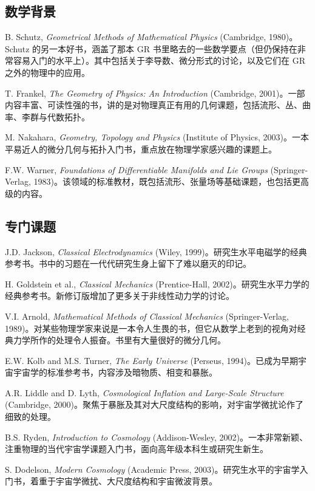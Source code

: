 \subsection*{数学背景}

B. Schutz, \emph{Geometrical Methods of Mathematical Physics} (Cambridge, 1980)。Schutz 的另一本好书，涵盖了那本 GR 书里略去的一些数学要点（但仍保持在非常容易入门的水平上）。其中包括关于李导数、微分形式的讨论，以及它们在 GR 之外的物理中的应用。

T. Frankel, \emph{The Geometry of Physics: An Introduction} (Cambridge, 2001)。一部内容丰富、可读性强的书，讲的是对物理真正有用的几何课题，包括流形、丛、曲率、李群与代数拓扑。

M. Nakahara, \emph{Geometry, Topology and Physics} (Institute of Physics, 2003)。一本平易近人的微分几何与拓扑入门书，重点放在物理学家感兴趣的课题上。

F.W. Warner, \emph{Foundations of Differentiable Manifolds and Lie Groups} (Springer-Verlag, 1983)。该领域的标准教材，既包括流形、张量场等基础课题，也包括更高级的内容。

\subsection*{专门课题}

J.D. Jackson, \emph{Classical Electrodynamics} (Wiley, 1999)。研究生水平电磁学的经典参考书。书中的习题在一代代研究生身上留下了难以磨灭的印记。

H. Goldstein et al., \emph{Classical Mechanics} (Prentice-Hall, 2002)。研究生水平力学的经典参考书。新修订版增加了更多关于非线性动力学的讨论。

V.I. Arnold, \emph{Mathematical Methods of Classical Mechanics} (Springer-Verlag, 1989)。对某些物理学家来说是一本令人生畏的书，但它从数学上老到的视角对经典力学所作的处理令人振奋。书里有大量很好的微分几何。

E.W. Kolb and M.S. Turner, \emph{The Early Universe} (Perseus, 1994)。已成为早期宇宙宇宙学的标准参考书，内容涉及暗物质、相变和暴胀。

A.R. Liddle and D. Lyth, \emph{Cosmological Inflation and Large-Scale Structure} (Cambridge, 2000)。聚焦于暴胀及其对大尺度结构的影响，对宇宙学微扰论作了细致的处理。

B.S. Ryden, \emph{Introduction to Cosmology} (Addison-Wesley, 2002)。一本非常新颖、注重物理的当代宇宙学课题入门书，面向高年级本科生或研究生新生。

S. Dodelson, \emph{Modern Cosmology} (Academic Press, 2003)。研究生水平的宇宙学入门书，着重于宇宙学微扰、大尺度结构和宇宙微波背景。

